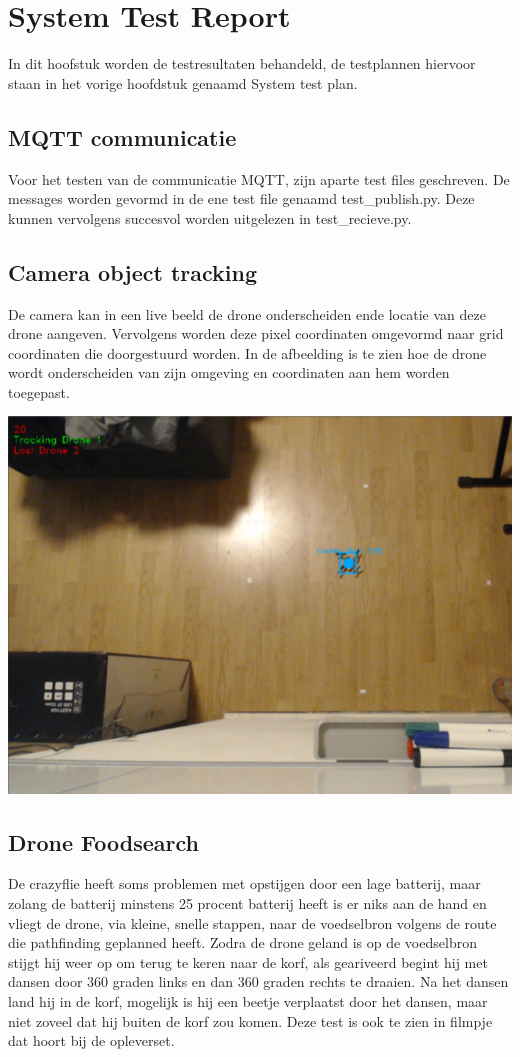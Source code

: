 \section{System Test Report}
In dit hoofstuk worden de testresultaten behandeld, de testplannen hiervoor staan in het vorige hoofdstuk genaamd System test plan.

\subsection{MQTT communicatie}
Voor het testen van de communicatie MQTT, zijn aparte test files geschreven. De messages worden gevormd in de ene test file genaamd test\_publish.py. Deze kunnen vervolgens succesvol worden uitgelezen in test\_recieve.py.

\subsection{Camera object tracking}
De camera kan in een live beeld de drone onderscheiden ende locatie van deze drone aangeven. Vervolgens worden deze pixel coordinaten omgevormd naar grid coordinaten die doorgestuurd worden. In de afbeelding is te zien hoe de drone wordt onderscheiden van zijn omgeving en coordinaten aan hem worden toegepast.
\begin{center}
    \includegraphics[scale=0.5]{trackedDrone.png}
\end{center}



\subsection{Drone Foodsearch}
De crazyflie heeft soms problemen met opstijgen door een lage batterij, maar zolang de batterij minstens 25 procent batterij heeft is er niks aan de hand en vliegt de drone, via kleine, snelle stappen, naar de voedselbron volgens de route die pathfinding geplanned heeft. Zodra de drone geland is op de voedselbron stijgt hij weer op om terug te keren naar de korf, als geariveerd begint hij met dansen door 360 graden links en dan 360 graden rechts te draaien. Na het dansen land hij in de korf, mogelijk is hij een beetje verplaatst door het dansen, maar niet zoveel dat hij buiten de korf zou komen.
Deze test is ook te zien in filmpje dat hoort bij de opleverset.

